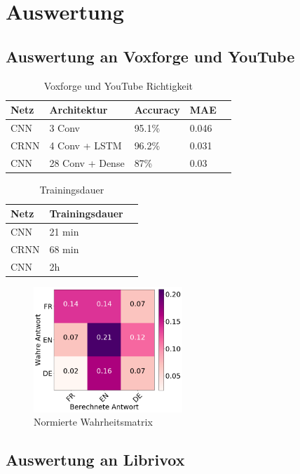 \section{Auswertung}

\subsection{Auswertung an Voxforge und YouTube}

\begin{table}[h]
	\centering
	\begin{tabular}{lllll}
		\hline
		Netz & Architektur     & Accuracy & MAE \\ \hline
		CNN  & 3 Conv          & 95.1\%     & 0.046  \\
		CRNN & 4 Conv + LSTM   & 96.2\%     & 0.031  \\
		CNN  & 28 Conv + Dense & 87\%     & 0.03  \\ \hline
	\end{tabular}
	\caption{Voxforge und YouTube Richtigkeit}
	\label{table:test}
\end{table}

\begin{table}[h]
	\centering
	\begin{tabular}{lll}
		\hline
		Netz & Trainingsdauer \\ \hline
		CNN  & 21 min \\
		CRNN & 68 min \\
		CNN  & 2h\\ \hline
	\end{tabular}
	\caption{Trainingsdauer}
	\label{table:test}
\end{table}

 \begin{figure}[hbt]
	\centering
		\includegraphics[width=0.5\textwidth]{assets/matrix.png}
	\caption{Normierte Wahrheitsmatrix}
	\label{img:matrix}
\end{figure}

\subsection{Auswertung an Librivox}
